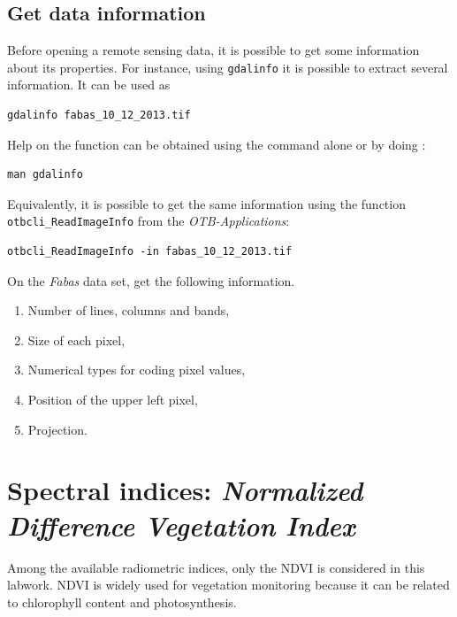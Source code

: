 \documentclass[a4paper,11pt,DIV=18]{scrartcl}
\begin{document}
\subsection{Get data information}
\label{sec:org078a3bb}
Before  opening a  remote sensing  data, it  is possible  to get  some
information about its  properties. For instance, using  \texttt{gdalinfo} it is
possible to extract several information.  It can be used as

\begin{verbatim}
gdalinfo fabas_10_12_2013.tif
\end{verbatim}

Help  on the function  can be obtained using  the command alone or by
doing :

\begin{verbatim}
man gdalinfo
\end{verbatim}

Equivalently, it is possible to get the same information using the
function \texttt{otbcli\_ReadImageInfo} from the \emph{OTB-Applications}:

\begin{verbatim}
otbcli_ReadImageInfo -in fabas_10_12_2013.tif
\end{verbatim}


\begin{work}
On the \emph{Fabas} data set, get the following information.
\begin{enumerate}
\item Number of lines, columns and bands,
\item Size of each pixel,
\item Numerical types for coding pixel values,
\item Position of the upper left pixel,
\item Projection.
\end{enumerate}
\end{work}
\section{Spectral indices: \emph{Normalized Difference Vegetation Index}}
\label{sec:org0403e08}
Among the available  radiometric indices, only the  NDVI is considered
in this labwork. NDVI is widely used for vegetation monitoring because
it can be related to chlorophyll content and photosynthesis.
\end{document}
